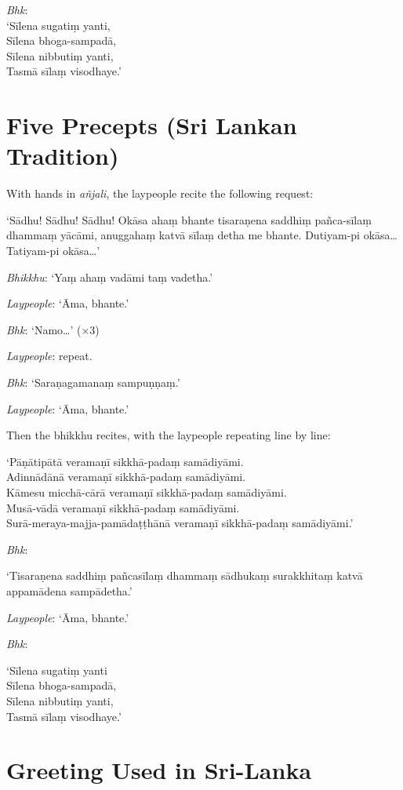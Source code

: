 \emph{Bhk}:\\
‘Sīlena sugatiṃ yanti,\\
Sīlena bhoga-sampadā,\\
Sīlena nibbutiṃ yanti,\\
Tasmā sīlaṃ visodhaye.’

\section{Five Precepts (Sri Lankan Tradition)}

With hands in \emph{añjali}, the laypeople recite the following request:

‘Sādhu! Sādhu! Sādhu! Okāsa ahaṃ bhante tisaraṇena saddhiṃ pañca-sīlaṃ dhammaṃ
yācāmi, anuggahaṃ katvā sīlaṃ detha me bhante. Dutiyam-pi okāsa… Tatiyam-pi
okāsa…’

\emph{Bhikkhu}: ‘Yaṃ ahaṃ vadāmi taṃ vadetha.’

\emph{Laypeople}: ‘Āma, bhante.’

\emph{Bhk}: ‘Namo…’ (×3)

\emph{Laypeople}: repeat.

\emph{Bhk}: ‘Saraṇagamanaṃ sampuṇṇaṃ.’

\emph{Laypeople}: ‘Āma, bhante.’

Then the bhikkhu recites, with the laypeople repeating line by line:

‘Pāṇātipātā veramaṇī sikkhā-padaṃ samādiyāmi.\\
Adinnādānā veramaṇī sikkhā-padaṃ samādiyāmi.\\
Kāmesu micchā-cārā veramaṇī sikkhā-padaṃ samādiyāmi.\\
Musā-vādā veramaṇī sikkhā-padaṃ samādiyāmi.\\
Surā-meraya-majja-pamādaṭṭhānā veramaṇī sikkhā-padaṃ samādiyāmi.’


\emph{Bhk}:

‘Tisaraṇena saddhiṃ pañcasīlaṃ dhammaṃ sādhukaṃ surakkhitaṃ katvā appamādena
sampādetha.’

\emph{Laypeople}: ‘Āma, bhante.’

\emph{Bhk}:

‘Sīlena sugatiṃ yanti\\
Sīlena bhoga-sampadā,\\
Sīlena nibbutiṃ yanti,\\
Tasmā sīlaṃ visodhaye.’

\section{Greeting Used in Sri-Lanka}

